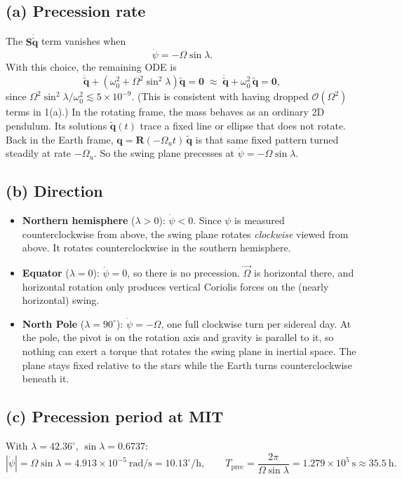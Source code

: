 \documentclass[11pt,letterpaper]{article}
\newcommand{\bq}{\mathbf{q}}
\newcommand{\tq}{\tilde{\mathbf{q}}}
\newcommand{\bR}{\mathbf{R}}
\newcommand{\bS}{\mathbf{S}}
\newcommand{\Ou}{\Omega_u}
\begin{document}
\subsection*{(a) Precession rate}

The $\bS\dot{\tq}$ term vanishes when
\[
\boxed{\dot\psi = -\Omega\sin\lambda .}
\]
With this choice, the remaining ODE is
\[
\ddot{\tq} + \left(\omega_0^2 + \Omega^2\sin^2\lambda\right)\tq = \mathbf 0
\;\approx\; \ddot{\tq} + \omega_0^2\,\tq = \mathbf 0,
\]
since $\Omega^2\sin^2\lambda/\omega_0^2 \lesssim 5\times10^{-9}$. (This is consistent with having dropped $\mathcal{O}(\Omega^2)$ terms in 1(a).) In the rotating frame, the mass behaves as an ordinary 2D pendulum. Its solutions $\tq(t)$ trace a fixed line or ellipse that does not rotate. Back in the Earth frame, $\bq = \bR(-\Ou t)\,\tq$ is that same fixed pattern turned steadily at rate $-\Ou$. So the swing plane precesses at $\dot\psi = -\Omega\sin\lambda$.

\subsection*{(b) Direction}

\begin{itemize}
    \item \textbf{Northern hemisphere} ($\lambda > 0$): $\dot\psi < 0$. Since $\psi$ is measured counterclockwise from above, the swing plane rotates \emph{clockwise} viewed from above. It rotates counterclockwise in the southern hemisphere.
    \item \textbf{Equator} ($\lambda = 0$): $\dot\psi = 0$, so there is no precession. $\vec\Omega$ is horizontal there, and horizontal rotation only produces vertical Coriolis forces on the (nearly horizontal) swing.
    \item \textbf{North Pole} ($\lambda = 90^\circ$): $\dot\psi = -\Omega$, one full clockwise turn per sidereal day. At the pole, the pivot is on the rotation axis and gravity is parallel to it, so nothing can exert a torque that rotates the swing plane in inertial space. The plane stays fixed relative to the stars while the Earth turns counterclockwise beneath it.
\end{itemize}

\subsection*{(c) Precession period at MIT}

With $\lambda = 42.36^\circ$, $\sin\lambda = 0.6737$:
\[
|\dot\psi| = \Omega\sin\lambda = 4.913\times10^{-5}~\text{rad/s} = 10.13^\circ/\text{h},
\qquad
T_{\text{prec}} = \frac{2\pi}{\Omega\sin\lambda} = 1.279\times10^5~\text{s} \approx \boxed{35.5~\text{h}.}
\]
\end{document}
